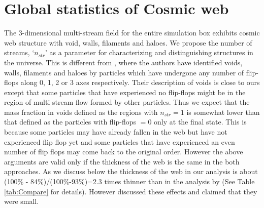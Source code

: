 \section{Global statistics of Cosmic web}
\label{sec:global}

The 3-dimensional multi-stream field for the entire simulation box exhibits cosmic web structure with void, walls, filaments and haloes. We propose the number of streams, `$n_{str}$' as a parameter for characterizing and distinguishing structures in the universe. This is different from \citet{Falck2015}, 
where the authors have identified voids, walls, filaments and haloes by particles which have undergone any number of flip-flops along 0, 1, 2 or 3 axes respectively. 
Their description of voids is close to ours except that some particles that have  experienced no flip-flops might be in the region
of multi stream flow formed by other particles.
Thus we expect that the mass fraction in voids defined as the regions with $n_{str} = 1$ is somewhat lower than that defined as the particles with 
flip-flops $= 0$ only at the final state. This is because some particles may have already fallen in the web but  have not experienced flip flop yet and 
some particles that have experienced an even number of flip flops may come back to the original order. However the above arguments are valid only if the thickness of the web is the same in the both approaches. As we discuss below the thickness of the web in our analysis is about (100\% - 84\%)/(100\%-93\%)=2.3 times thinner than in  the analysis by \citet{Falck2015} (See Table \ref{tab:Compare} for details). However  \citet{Falck2015} discussed these effects and claimed that they were small.


